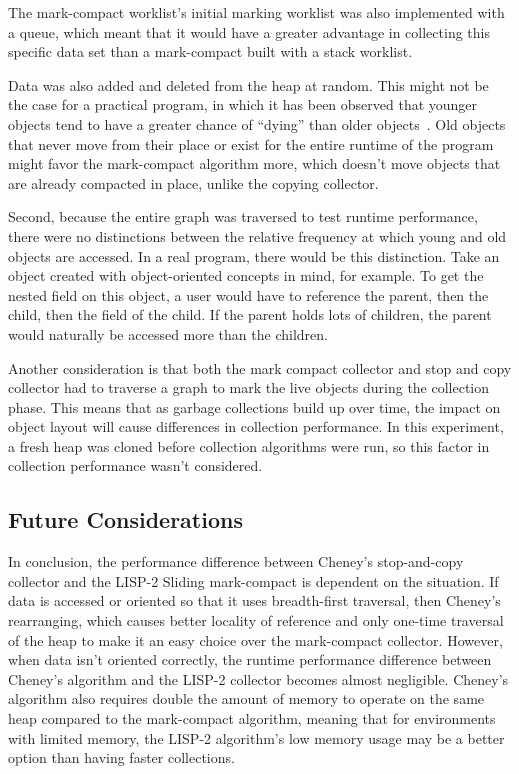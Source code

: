 \documentclass[index]{subfiles}
\begin{document}
The mark-compact worklist's initial marking worklist was also implemented with a queue, which meant that it would have a greater advantage in collecting this specific data set than a mark-compact built with a stack worklist.

Data was also added and deleted from the heap at random. This might not be the case for a practical program, in which it has been observed that younger objects tend to have a greater chance of ``dying'' than older objects~\parencite{youtube_introductory_video}. Old objects that never move from their place or exist for the entire runtime of the program might favor the mark-compact algorithm more, which doesn't move objects that are already compacted in place, unlike the copying collector.

Second, because the entire graph was traversed to test runtime performance, there were no distinctions between the relative frequency at which young and old objects are accessed. In a real program, there would be this distinction. Take an object created with object-oriented concepts in mind, for example. To get the nested field on this object, a user would have to reference the parent, then the child, then the field of the child. If the parent holds lots of children, the parent would naturally be accessed more than the children.

Another consideration is that both the mark compact collector and stop and copy collector had to traverse a graph to mark the live objects during the collection phase. This means that as garbage collections build up over time, the impact on object layout will cause differences in collection performance. In this experiment, a fresh heap was cloned before collection algorithms were run, so this factor in collection performance wasn't considered.

\subsection{Future Considerations}

In conclusion, the performance difference between Cheney's stop-and-copy collector and the LISP-2 Sliding mark-compact is dependent on the situation. If data is accessed or oriented so that it uses breadth-first traversal, then Cheney's rearranging, which causes better locality of reference and only one-time traversal of the heap to make it an easy choice over the mark-compact collector. However, when data isn't oriented correctly, the runtime performance difference between Cheney's algorithm and the LISP-2 collector becomes almost negligible. Cheney's algorithm also requires double the amount of memory to operate on the same heap compared to the mark-compact algorithm, meaning that for environments with limited memory, the LISP-2 algorithm's low memory usage may be a better option than having faster collections.
\end{document}
